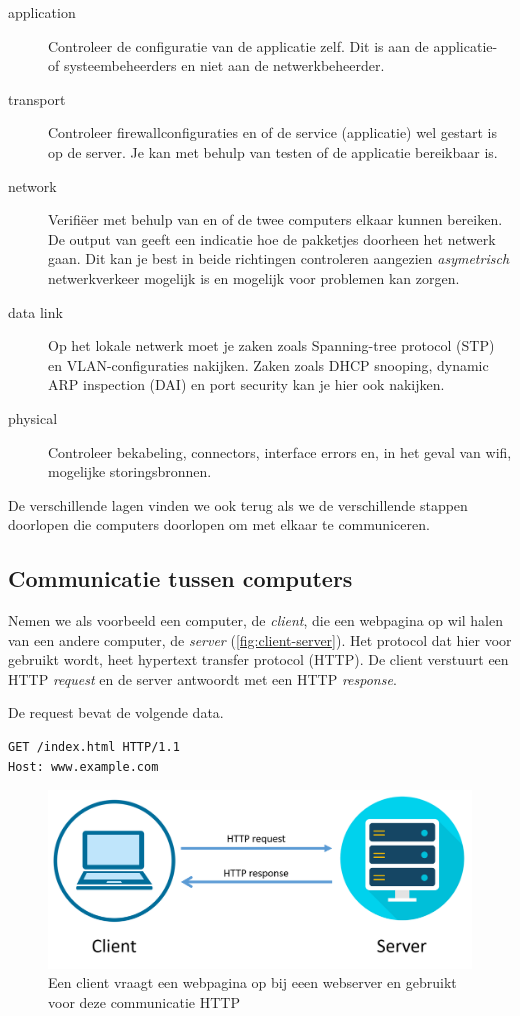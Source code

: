\begin{description}
\item[application]
   Controleer de configuratie van de applicatie zelf.
   Dit is aan de applicatie- of systeembeheerders en niet aan de netwerkbeheerder.
\item[transport]
   Controleer firewallconfiguraties en of de service (applicatie) wel gestart is op de server.
   Je kan met behulp van  testen of de applicatie bereikbaar is.
\item[network]
   Verifiëer met behulp van  en  of de twee computers elkaar kunnen bereiken.
   De output van  geeft een indicatie hoe de pakketjes doorheen het netwerk gaan.
   Dit kan je best in beide richtingen controleren aangezien \emph{asymetrisch} netwerkverkeer mogelijk is en mogelijk voor problemen kan zorgen.
\item[data link]
   Op het lokale netwerk moet je zaken zoals Spanning-tree protocol (STP) en VLAN-configuraties nakijken.
   Zaken zoals DHCP snooping, dynamic ARP inspection (DAI) en port security kan je hier ook nakijken.
\item[physical]
  Controleer bekabeling, connectors, interface errors en, in het geval van wifi, mogelijke storingsbronnen.
\end{description}

De verschillende lagen vinden we ook terug als we de verschillende stappen doorlopen die computers doorlopen om met elkaar te communiceren.



\subsection{Communicatie tussen computers}

Nemen we als voorbeeld een computer, de \emph{client}, die een webpagina op wil halen van een andere computer, de \emph{server} (\vref{fig:client-server}).
Het protocol dat hier voor gebruikt wordt, heet hypertext transfer protocol (HTTP).
De client verstuurt een HTTP \emph{request} en de server antwoordt met een HTTP \emph{response}.

De request bevat de volgende data.
\begin{verbatim}
GET /index.html HTTP/1.1
Host: www.example.com
\end{verbatim}

\begin{figure}
   \centering
   \includegraphics[width=.65\textwidth]{images/http-request.png}
   \caption{Een client vraagt een webpagina op bij eeen webserver en gebruikt voor deze communicatie HTTP}
   \label{fig:client-server}
\end{figure}

